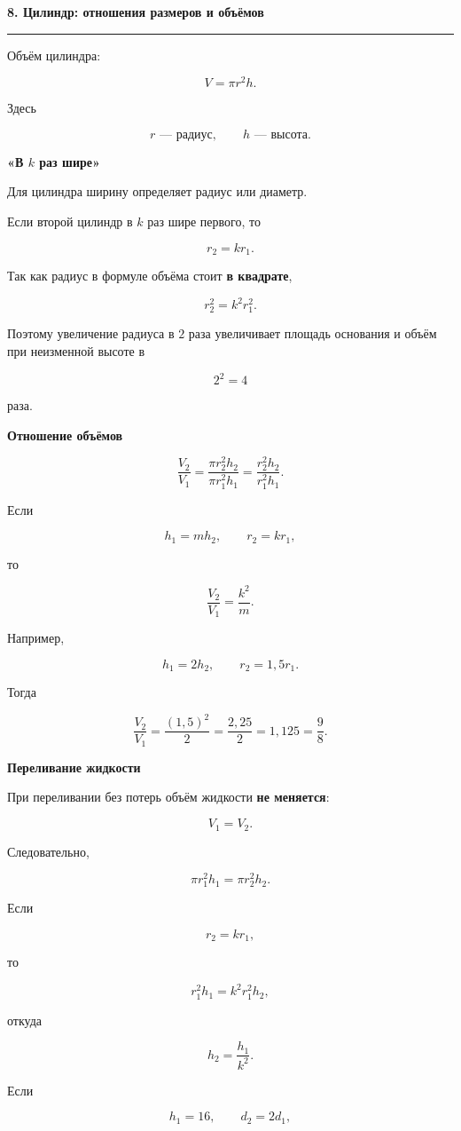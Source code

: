 \documentclass[a4paper,12pt]{article}
\newcommand{\topic}[1]{%
  \vspace{0.8em}
  {\Large\bfseries\textcolor{darkaccent}{#1}}\par
  \vspace{0.25em}
  {\color{accent}\rule{\linewidth}{0.6pt}}
  \vspace{0.45em}
}
\newcommand{\subtopic}[1]{%
  \vspace{0.45em}
  {\large\bfseries\textcolor{accent}{#1}}\par
  \vspace{0.2em}
}
\newcommand{\key}[1]{\textcolor{darkaccent}{\textbf{#1}}}
\begin{document}
\topic{8. Цилиндр: отношения размеров и объёмов}

Объём цилиндра:

\[
\boxed{
V=\pi r^2h.
}
\]

Здесь

\[
r \text{ --- радиус},
\qquad
h \text{ --- высота}.
\]

\subtopic{«В \(k\) раз шире»}

Для цилиндра ширину определяет радиус или диаметр.

Если второй цилиндр в \(k\) раз шире первого, то

\[
r_2=kr_1.
\]

Так как радиус в формуле объёма стоит \key{в квадрате},

\[
r_2^2=k^2r_1^2.
\]

Поэтому увеличение радиуса в \(2\) раза увеличивает площадь основания и объём при неизменной высоте в

\[
2^2=4
\]

раза.

\subtopic{Отношение объёмов}

\[
\frac{V_2}{V_1}
=
\frac{\pi r_2^2h_2}
{\pi r_1^2h_1}
=
\boxed{
\frac{r_2^2h_2}{r_1^2h_1}
}.
\]

Если

\[
h_1=mh_2,
\qquad
r_2=kr_1,
\]

то

\[
\boxed{
\frac{V_2}{V_1}=\frac{k^2}{m}.
}
\]

Например,

\[
h_1=2h_2,
\qquad
r_2=1{,}5r_1.
\]

Тогда

\[
\frac{V_2}{V_1}
=
\frac{(1{,}5)^2}{2}
=
\frac{2{,}25}{2}
=
1{,}125
=
\boxed{\frac98}.
\]

\subtopic{Переливание жидкости}

При переливании без потерь объём жидкости \key{не меняется}:

\[
V_1=V_2.
\]

Следовательно,

\[
\pi r_1^2h_1
=
\pi r_2^2h_2.
\]

Если

\[
r_2=kr_1,
\]

то

\[
r_1^2h_1
=
k^2r_1^2h_2,
\]

откуда

\[
\boxed{
h_2=\frac{h_1}{k^2}.
}
\]

Если

\[
h_1=16,
\qquad
d_2=2d_1,
\]
\end{document}
